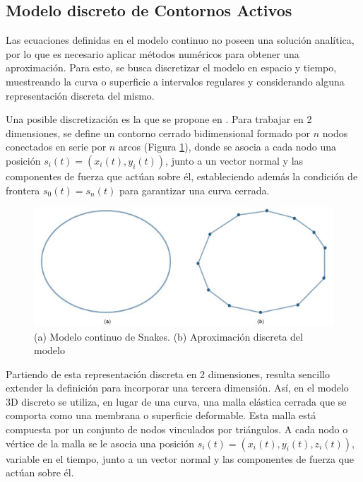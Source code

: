 \subsection{Modelo discreto de Contornos Activos}\label{section:modelo_discreto_contornos_activos}
Las ecuaciones definidas en el modelo continuo no poseen una solución analítica, por lo que es necesario aplicar métodos numéricos para obtener una aproximación. Para esto, se busca discretizar el modelo en espacio y tiempo, muestreando la curva o superficie a intervalos regulares y considerando alguna representación discreta del mismo.

Una posible discretización es la que se propone en \citep{mcinerney2000t}. Para trabajar en 2 dimensiones, se define un contorno cerrado bidimensional formado por $n$ nodos conectados en serie por $n$ arcos (Figura \ref{fig:modelo_continuo_snakes}), donde se asocia a cada nodo una posición $s_{i}(t) = (x_{i}(t),y_{i}(t))$, junto a un vector normal y las componentes de fuerza que actúan sobre él, estableciendo además la condición de frontera $s_{0}(t)=s_{n}(t)$ para garantizar una curva cerrada.

\begin{figure}[H]
	\centering
	\includegraphics[scale=0.6]{images/ovalo_continuo_vs_discreto.jpg}
	\caption{(a) Modelo continuo de Snakes. (b) Aproximación discreta del modelo}
	\label{fig:modelo_continuo_snakes}
\end{figure}

Partiendo de esta representación discreta en 2 dimensiones, resulta sencillo extender la definición para incorporar una tercera dimensión. Así, en el modelo 3D discreto se utiliza, en lugar de una curva, una malla elástica cerrada que se comporta como una membrana o superficie deformable. Esta malla está compuesta por un conjunto de nodos vinculados por triángulos. A cada nodo o vértice de la malla se le asocia una posición $s_{i}(t)=(x_{i}(t),y_{i}(t), z_{i}(t))$, variable en el tiempo, junto a un vector normal y las componentes de fuerza que actúan sobre él.

